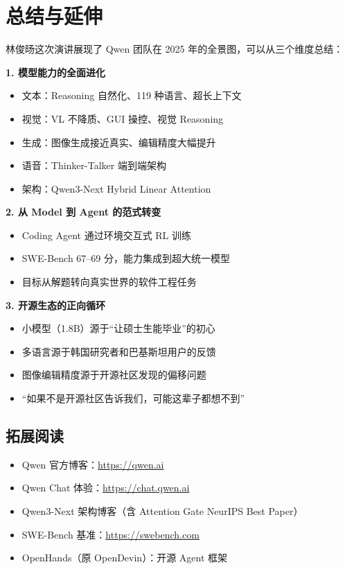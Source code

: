 \section{总结与延伸}

林俊旸这次演讲展现了 Qwen 团队在 2025 年的全景图，可以从三个维度总结：

\textbf{1. 模型能力的全面进化}
\begin{itemize}
    \item 文本：Reasoning 自然化、119 种语言、超长上下文
    \item 视觉：VL 不降质、GUI 操控、视觉 Reasoning
    \item 生成：图像生成接近真实、编辑精度大幅提升
    \item 语音：Thinker-Talker 端到端架构
    \item 架构：Qwen3-Next Hybrid Linear Attention
\end{itemize}

\textbf{2. 从 Model 到 Agent 的范式转变}
\begin{itemize}
    \item Coding Agent 通过环境交互式 RL 训练
    \item SWE-Bench 67--69 分，能力集成到超大统一模型
    \item 目标从解题转向真实世界的软件工程任务
\end{itemize}

\textbf{3. 开源生态的正向循环}
\begin{itemize}
    \item 小模型（1.8B）源于``让硕士生能毕业''的初心
    \item 多语言源于韩国研究者和巴基斯坦用户的反馈
    \item 图像编辑精度源于开源社区发现的偏移问题
    \item ``如果不是开源社区告诉我们，可能这辈子都想不到''
\end{itemize}

\subsection{拓展阅读}

\begin{itemize}
    \item Qwen 官方博客：\url{https://qwen.ai}
    \item Qwen Chat 体验：\url{https://chat.qwen.ai}
    \item Qwen3-Next 架构博客（含 Attention Gate NeurIPS Best Paper）
    \item SWE-Bench 基准：\url{https://swebench.com}
    \item OpenHands（原 OpenDevin）：开源 Agent 框架
\end{itemize}



